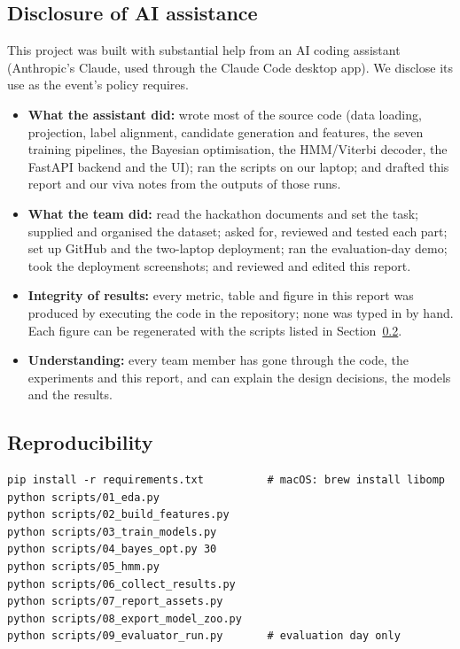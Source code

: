 \documentclass[10pt,a4paper]{article}
\begin{document}
\subsection{Disclosure of AI assistance}
This project was built with substantial help from an AI coding assistant (Anthropic's Claude, used through the Claude Code desktop app). We disclose its use as the event's policy requires.
\begin{itemize}
  \item \textbf{What the assistant did:} wrote most of the source code (data loading, projection, label alignment, candidate generation and features, the seven training pipelines, the Bayesian optimisation, the HMM/Viterbi decoder, the FastAPI backend and the UI); ran the scripts on our laptop; and drafted this report and our viva notes from the outputs of those runs.
  \item \textbf{What the team did:} read the hackathon documents and set the task; supplied and organised the dataset; asked for, reviewed and tested each part; set up GitHub and the two-laptop deployment; ran the evaluation-day demo; took the deployment screenshots; and reviewed and edited this report.
  \item \textbf{Integrity of results:} every metric, table and figure in this report was produced by executing the code in the repository; none was typed in by hand. Each figure can be regenerated with the scripts listed in Section~\ref{sec:repro}.
  \item \textbf{Understanding:} every team member has gone through the code, the experiments and this report, and can explain the design decisions, the models and the results.
\end{itemize}
\subsection{Reproducibility}\label{sec:repro}
\begin{verbatim}
pip install -r requirements.txt          # macOS: brew install libomp
python scripts/01_eda.py
python scripts/02_build_features.py
python scripts/03_train_models.py
python scripts/04_bayes_opt.py 30
python scripts/05_hmm.py
python scripts/06_collect_results.py
python scripts/07_report_assets.py
python scripts/08_export_model_zoo.py
python scripts/09_evaluator_run.py       # evaluation day only
\end{verbatim}
\end{document}
